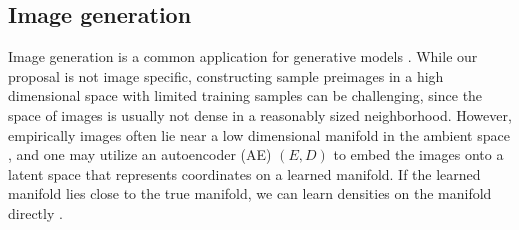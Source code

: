 
\subsection{Image generation} Image generation is a common application for generative models \citep{goodfellow2014gan,dinh2017RealNVP}. 
While our proposal is not image specific, constructing sample preimages in a high dimensional space with limited training samples can be challenging, 
since the space of images is usually not dense in a reasonably sized neighborhood. However, empirically images often lie near a low dimensional manifold in the ambient space \citep{Seung2000manifold}, and one may utilize an autoencoder (AE) $(E, D)$ to embed the images onto a latent space that represents coordinates on a learned manifold. If the learned manifold lies close to the true manifold, we can learn densities on the manifold directly \citep{dai2018diagnosing}. 

